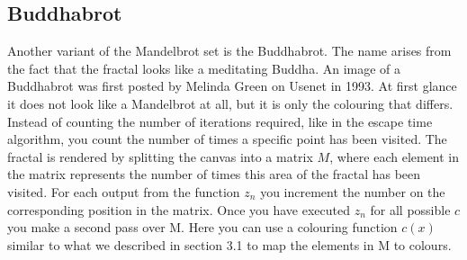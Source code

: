 \documentclass{article}
\begin{document}
\subsection{Buddhabrot}
Another variant of the Mandelbrot set is the Buddhabrot. The name arises from the fact that the fractal looks like a meditating Buddha. An image of a Buddhabrot was first posted by Melinda Green on Usenet in 1993\cite{wikipedia}. At first glance it does not look like a Mandelbrot at all, but it is only the colouring that differs. Instead of counting the number of iterations required, like in the escape time algorithm, you count the number of times a specific point has been visited. The fractal is rendered by splitting the canvas into a matrix $M$, where each element in the matrix represents the number of times this area of the fractal has been visited. For each output from the function $z_{n}$ you increment the number on the corresponding position in the matrix. Once you have executed $z_{n}$ for all possible $c$ you make a second pass over M. Here you can use a colouring function $c(x)$ similar to what we described in section 3.1 to map the elements in M to colours.
\end{document}
